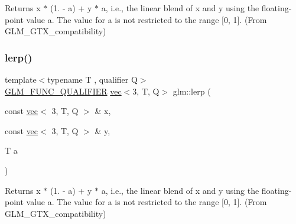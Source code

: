 Returns x $\ast$ (1. -\/ a) + y $\ast$ a, i.\+e., the linear blend of x and y using the floating-\/point value a. The value for a is not restricted to the range \mbox{[}0, 1\mbox{]}. (From G\+L\+M\+\_\+\+G\+T\+X\+\_\+compatibility) 

\mbox{\label{group__gtx__compatibility_ga44a8b5fd776320f1713413dec959b32a}} 
\subsubsection{\texorpdfstring{lerp()}{lerp()}\hspace{0.1cm}{\footnotesize\ttfamily [3/7]}}
{\footnotesize\ttfamily template$<$typename T , qualifier Q$>$ \\
\mbox{\hyperlink{setup_8hpp_a33fdea6f91c5f834105f7415e2a64407}{G\+L\+M\+\_\+\+F\+U\+N\+C\+\_\+\+Q\+U\+A\+L\+I\+F\+I\+ER}} \mbox{\hyperlink{structglm_1_1vec}{vec}}$<$3, T, Q$>$ glm\+::lerp (\begin{DoxyParamCaption}\item[{const \mbox{\hyperlink{structglm_1_1vec}{vec}}$<$ 3, T, Q $>$ \&}]{x,  }\item[{const \mbox{\hyperlink{structglm_1_1vec}{vec}}$<$ 3, T, Q $>$ \&}]{y,  }\item[{T}]{a }\end{DoxyParamCaption})}



Returns x $\ast$ (1. -\/ a) + y $\ast$ a, i.\+e., the linear blend of x and y using the floating-\/point value a. The value for a is not restricted to the range \mbox{[}0, 1\mbox{]}. (From G\+L\+M\+\_\+\+G\+T\+X\+\_\+compatibility) 

\mbox{\label{group__gtx__compatibility_ga89ac8e000199292ec7875519d27e214b}} 
